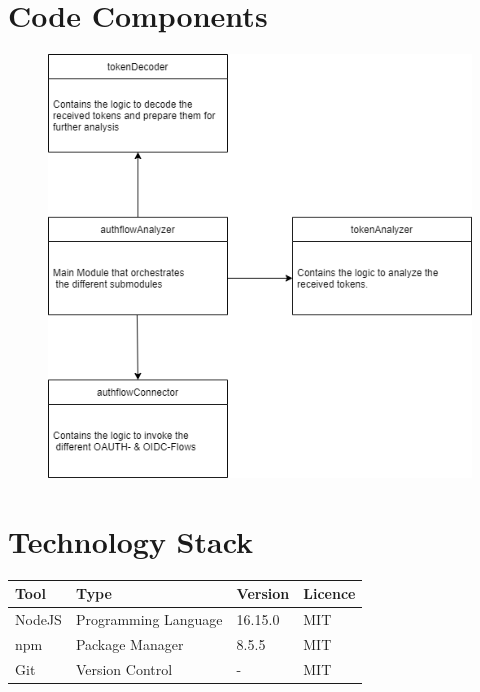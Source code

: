 \documentclass[12pt]{article}
\begin{document}
\section{Code Components}
\begin{figure}[!h]
    \centering
    \includegraphics[width=\textwidth]{Code-Components}
\end{figure}


\section{Technology Stack}
\begin{center}
\begin{tabular}{|l|l|l|l|}
    \hline
    \textbf{Tool} & \textbf{Type} & \textbf{Version} & \textbf{Licence} \\\hline
    NodeJS & Programming Language & 16.15.0 & MIT\\
    \hline
    npm & Package Manager & 8.5.5 & MIT\\
    \hline
    Git & Version Control & - & MIT\\
    \hline
\end{tabular}
\end{center}
\end{document}
